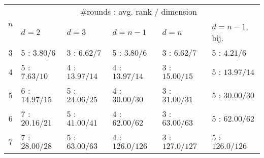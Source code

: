 {
  \renewcommand\arraystretch{1.2}

  \begin{table}
      \centering
      \begin{tabular}{c|lllll}
        \toprule
        \multirow{2}{*}{$n$} & \multicolumn{5}{c}{\#rounds : avg. rank / dimension} \\

        & $d=2$ & $d=3$ & $d=n-1$ & $d=n$ & $d=n-1$, bij. \\
        \midrule
        
3 &
5 : $3.80 / 6$ &
3 : $6.62 / 7$ &
5 : $3.80 / 6$ &
3 : $6.62 / 7$ &
5 : $4.21 / 6$ \\ 

4 &
5 : $7.63 / 10$ &
4 : $13.97 / 14$ &
4 : $13.97 / 14$ &
3 : $15.00 / 15$ &
5 : $13.97 / 14$ \\ 

5 &
6 : $14.97 / 15$ &
5 : $24.06 / 25$ &
4 : $30.00 / 30$ &
3 : $31.00 / 31$ &
5 : $30.00 / 30$ \\ 

6 &
7 : $20.16 / 21$ &
5 : $41.00 / 41$ &
4 : $62.00 / 62$ &
3 : $63.00 / 63$ &
5 : $62.00 / 62$ \\

7 &
7 : $28.00 / 28$ &
5 : $63.00 / 63$ &
4 : $126.0 / 126$ &
3 : $127.0 / 127$ &
5 : $126.0 / 126$ \\
        
        \bottomrule
      \end{tabular}
  \end{table}
}